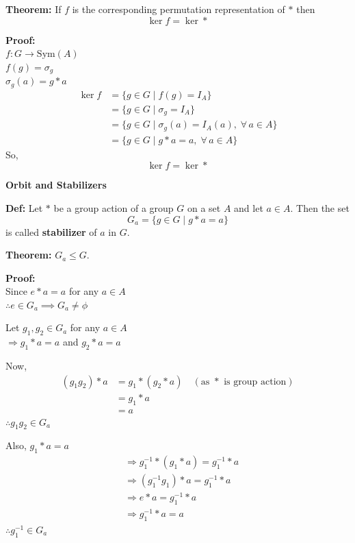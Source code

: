 \documentclass[11pt]{article}
\begin{document}
\bigskip
\noindent \textbf{Theorem:} If $f$ is the corresponding permutation representation of $*$ then
\[
\ker f = \ker *
\]

\noindent \textbf{Proof:} \\
$f : G \to \text{Sym}(A)$ \\
$f(g) = \sigma_g$ \\
$\sigma_g(a) = g * a$
\begin{align*}
\ker f &= \{g \in G \mid f(g) = I_A\} \\
&= \{g \in G \mid \sigma_g = I_A\} \\
&= \{g \in G \mid \sigma_g(a) = I_A(a), \; \forall\, a \in A\} \\
&= \{g \in G \mid g * a = a, \; \forall\, a \in A\}
\end{align*}
So,
\[
\ker f = \ker *
\]

\bigskip
\noindent \textbf{Orbit and Stabilizers}

\noindent \textbf{Def:} Let $*$ be a group action of a group $G$ on a set $A$ and let $a \in A$. Then the set
\[
G_a = \{g \in G \mid g * a = a\}
\]
is called \textbf{stabilizer} of $a$ in $G$.

\bigskip
\noindent \textbf{Theorem:} $G_a \le G$.

\medskip
\noindent \textbf{Proof:} \\
Since $e * a = a$ for any $a \in A$ \\
$\therefore e \in G_a \implies G_a \ne \phi$

\noindent Let $g_1, g_2 \in G_a$ for any $a \in A$ \\
$\Rightarrow g_1 * a = a$ and $g_2 * a = a$

\noindent Now,
\begin{align*}
(g_1 g_2) * a &= g_1 * (g_2 * a) \quad (\text{as } * \text{ is group action}) \\
&= g_1 * a \\
&= a \tag{1}
\end{align*}
$\therefore g_1 g_2 \in G_a$

\noindent Also, $g_1 * a = a$
\begin{align*}
&\Rightarrow g_1^{-1} * (g_1 * a) = g_1^{-1} * a \\
&\Rightarrow (g_1^{-1} g_1) * a = g_1^{-1} * a \\
&\Rightarrow e * a = g_1^{-1} * a \\
&\Rightarrow g_1^{-1} * a = a \tag{2}
\end{align*}
$\therefore g_1^{-1} \in G_a$
\end{document}
